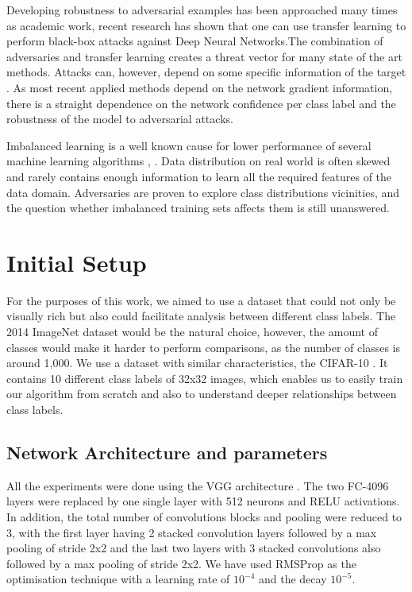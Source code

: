 \documentclass[runningheads,a4paper]{llncs}
\begin{document}
Developing robustness to adversarial examples has been approached many times as academic work, recent research \cite{papernot2016} has shown that one can use transfer learning \cite{yosinski2014transferable} to perform black-box attacks against Deep Neural Networks.The combination of adversaries and transfer learning creates a threat vector for many state of the art methods. Attacks can, however, depend on some specific information of the target \cite{papernot2016transf}. As most recent applied methods depend on the network gradient information, there is a straight dependence on the network confidence per class label and the robustness of the model to adversarial attacks.

Imbalanced learning is a well known cause for lower performance of several machine learning algorithms \cite{japkowicz2002class}, \cite{krawczyk2016learning}. Data distribution on real world is often skewed and rarely contains enough information to learn all the required features of the data domain. Adversaries are proven to explore class distributions vicinities, and the question whether imbalanced training sets affects them is still unanswered.


\section{Initial Setup}

For the purposes of this work, we aimed to use a dataset that could not only be visually rich but also could facilitate analysis between different class labels. The 2014 ImageNet dataset \cite{deng2009imagenet} would be the natural choice, however, the amount of classes would make it harder to perform comparisons, as the number of classes is around 1,000. We use a dataset with similar characteristics, the CIFAR-10 \cite{krizhevsky_2009}. It contains 10 different class labels of 32x32 images, which enables us to easily train our algorithm from scratch and also to understand deeper relationships between class labels.
\subsection{Network Architecture and parameters}

All the experiments were done using the VGG architecture \cite{simonyan2014very}. The two FC-4096 layers were replaced by one single layer with 512 neurons and RELU activations. In addition, the total number of convolutions blocks and pooling were reduced to 3, with the first layer having 2 stacked convolution layers followed by a max pooling of stride 2x2 and the last two layers with 3 stacked convolutions also followed by a max pooling of stride 2x2. We have used RMSProp  \cite{bengiormsprop} as the optimisation technique with a learning rate of $10^{-4}$ and the decay $10^{-5}$.
\end{document}

